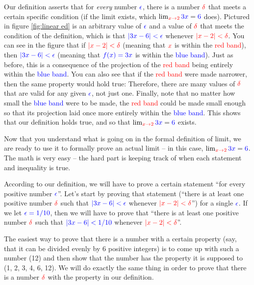 \documentclass{myarticle}
\newcommand{\hor}[1]{\textcolor{red}{#1}} %
\newcommand{\ver}[1]{\textcolor{blue}{#1}}
\newcommand{\olive}[1]{\textcolor{green!50!red}{#1}}
\theoremstyle{nospace}
\newtheorem{old series theorem}{Theorem}
\newenvironment{series theorem}{\begin{mdframed}\begin{old series theorem}}{\end{old series theorem}\end{mdframed}}
\begin{document}
Our definition asserts that for \emph{every} number $\ver{\epsilon}$, there is a number $\hor{\delta}$ that meets a certain specific condition (if the limit exists, which $\lim_{\hor{x \to 2}} \ver{3x} = \ver{6}$ does). Pictured in figure \ref{fig:linear ed} is an arbitrary value of $\ver{\epsilon}$ and a value of $\hor{\delta}$ that meets the condition of the definition, which is that $\ver{|3x - 6| < \epsilon}$ whenever $\hor{|x - 2| < \delta}$. You can see in the figure that if $\hor{|x - 2| < \delta}$ (meaning that $\hor{x}$ is within the \hor{red band}), then $\ver{|3x - 6| < \epsilon}$ (meaning that $\ver{f(x) = 3x}$ is within the \ver{blue band}). Just as before, this is a consequence of the \olive{projection} of the \hor{red band} being entirely within the \ver{blue band}. You can also see that if the \hor{red band} were made narrower, then the same property would hold true: Therefore, there are many values of $\hor{\delta}$ that are valid for any given $\ver{\epsilon}$, not just one. Finally, note that no matter how small the \ver{blue band} were to be made, the \hor{red band} could be made small enough so that its \olive{projection} laid once more entirely within the \ver{blue band}. This shows that our definition holds true, and so that $\lim_{\hor{x \to 2}} \ver{3x} = \ver{6}$ exists.

Now that you understand what is going on in the formal definition of limit, we are ready to use it to formally prove an actual limit -- in this case, $\lim_{\hor{x \to 2}} \ver{3x} = \ver{6}$. The math is very easy -- the hard part is keeping track of when each statement and inequality is true.

According to our definition, we will have to prove a certain statement ``for every positive number $\ver{\epsilon}$''. Let's start by proving that statement (``there is at least one positive number $\hor{\delta}$ such that $\ver{|3x - 6| < \epsilon}$ whenever $\hor{|x - 2| < \delta}$'') for a single $\ver{\epsilon}$. If we let $\ver{\epsilon = 1/10}$, then we will have to prove that ``there is at least one positive number $\hor{\delta}$ such that $\ver{|3x - 6| < 1/10}$ whenever $\hor{|x - 2| < \delta}$''.

The easiest way to prove that there is a number with a certain property (say, that it can be divided evenly by 6 positive integers) is to come up with such a number (12) and then show that the number has the property it is supposed to (1, 2, 3, 4, 6, 12). We will do exactly the same thing in order to prove that there is a number $\hor{\delta}$ with the property in our definition.
\end{document}
